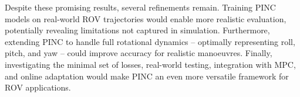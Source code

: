 
Despite these promising results, several refinements remain. Training PINC models on real-world ROV trajectories would enable more realistic evaluation, potentially revealing limitations not captured in simulation. Furthermore, extending PINC to handle full rotational dynamics -- optimally representing roll, pitch, and yaw -- could improve accuracy for realistic manoeuvres. Finally, investigating the minimal set of losses, real-world testing, integration with MPC, and online adaptation would make PINC an even more versatile framework for ROV applications.